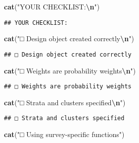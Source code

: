 \documentclass[
]{article}
\newenvironment{Shaded}{\begin{snugshade}}{\end{snugshade}}
\newcommand{\FunctionTok}[1]{\textcolor[rgb]{0.13,0.29,0.53}{\textbf{#1}}}
\newcommand{\NormalTok}[1]{#1}
\newcommand{\SpecialCharTok}[1]{\textcolor[rgb]{0.81,0.36,0.00}{\textbf{#1}}}
\newcommand{\StringTok}[1]{\textcolor[rgb]{0.31,0.60,0.02}{#1}}
\begin{document}
\begin{Shaded}
\begin{Highlighting}[]
\FunctionTok{cat}\NormalTok{(}\StringTok{"YOUR CHECKLIST:}\SpecialCharTok{\textbackslash{}n}\StringTok{"}\NormalTok{)}
\end{Highlighting}
\end{Shaded}

\begin{verbatim}
## YOUR CHECKLIST:
\end{verbatim}

\begin{Shaded}
\begin{Highlighting}[]
\FunctionTok{cat}\NormalTok{(}\StringTok{"□ Design object created correctly}\SpecialCharTok{\textbackslash{}n}\StringTok{"}\NormalTok{)}
\end{Highlighting}
\end{Shaded}

\begin{verbatim}
## □ Design object created correctly
\end{verbatim}

\begin{Shaded}
\begin{Highlighting}[]
\FunctionTok{cat}\NormalTok{(}\StringTok{"□ Weights are probability weights}\SpecialCharTok{\textbackslash{}n}\StringTok{"}\NormalTok{)}
\end{Highlighting}
\end{Shaded}

\begin{verbatim}
## □ Weights are probability weights
\end{verbatim}

\begin{Shaded}
\begin{Highlighting}[]
\FunctionTok{cat}\NormalTok{(}\StringTok{"□ Strata and clusters specified}\SpecialCharTok{\textbackslash{}n}\StringTok{"}\NormalTok{)}
\end{Highlighting}
\end{Shaded}

\begin{verbatim}
## □ Strata and clusters specified
\end{verbatim}

\begin{Shaded}
\begin{Highlighting}[]
\FunctionTok{cat}\NormalTok{(}\StringTok{"□ Using survey{-}specific functions"}\NormalTok{)}
\end{Highlighting}
\end{Shaded}
\end{document}
